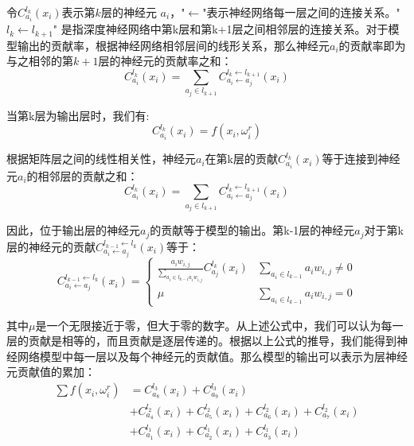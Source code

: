令$C_{a_{i}}^{l_{k}}\left(x_{i}\right)$表示第$k$层的神经元 $a_{i}$，"$\leftarrow$"表示神经网络每一层之间的连接关系。"$l_{k} \leftarrow l_{k+1}$" 是指深度神经网络中第k层和第k+1层之间相邻层的连接关系。对于模型输出的贡献率，根据神经网络相邻层间的线形关系，那么神经元$a_{i}$的贡献率即为与之相邻的第$k+1$层的神经元的贡献率之和：
$$
C_{a_{i}}^{l_{k}}\left(x_{i}\right)=\sum_{a_{j} \in l_{k+1}} C_{a_{i} \leftarrow a_{j}}^{l_{k} \leftarrow l_{k+1}}\left(x_{i}\right)
$$

当第k层为输出层时，我们有:
\begin{equation}
C_{a_{i}}^{l_{k}}\left(x_{i}\right)=f\left(x_{i}, \omega_{i}^{r}\right)
\end{equation}

根据矩阵层之间的线性相关性，神经元$a_{i}$在第k层的贡献$C_{a_{i}}^{l_{k}}\left(x_{i}\right)$等于连接到神经元$a_{i}$的相邻层的贡献之和：
\begin{equation}\label{eq:层间传播1}
C_{a_{i}}^{l_{k}}\left(x_{i}\right)=\sum_{a_{j} \in l_{k+1}} C_{a_{i} \leftarrow a_{j}}^{l_{k} \leftarrow l_{k+1}}\left(x_{i}\right)
\end{equation}

因此，位于输出层的神经元$a_{j}$的贡献等于模型的输出。第k-1层的神经元$a_{j}$对于第k层的神经元的贡献$C_{a_{i} \leftarrow a_{j}}^{l_{k-1} \leftarrow l_{k}}\left(x_{i}\right)$等于：
\begin{equation}
C_{a_{i} \leftarrow a_{j}}^{l_{k-1} \leftarrow l_{k}}\left(x_{i}\right)=\left\{\begin{array}{cc}\frac{a_{i} w_{i, j}}{\sum_{a_{i} \in l_{k-1} a_{i} w_{i, j}}} C_{a_{j}}^{l_{k}}\left(x_{i}\right) & \sum_{a_{i} \in l_{k-1}} a_{i} w_{i, j} \neq 0 \\ \mu & \sum_{a_{i} \in l_{k-1}} a_{i} w_{i, j}=0\end{array}\right.
\end{equation}

其中$\mu$是一个无限接近于零，但大于零的数字。从上述公式中，我们可以认为每一层的贡献是相等的，而且贡献是逐层传递的。根据以上公式的推导，我们能得到神经网络模型中每一层以及每个神经元的贡献值。那么模型的输出可以表示为层神经元贡献值的累加：
$$
\begin{aligned}
\sum f\left(x_{i}, \omega_{i}^{r}\right) &=C_{a_{8}}^{l_{3}}\left(x_{i}\right)+C_{a_{9}}^{l_{3}}\left(x_{i}\right)\\
&+C_{a_{4}}^{l_{2}}\left(x_{i}\right)+C_{a_{5}}^{l_{2}}\left(x_{i}\right)+C_{a_{6}}^{l_{2}}\left(x_{i}\right)+C_{a_{7}}^{l_{2}}\left(x_{i}\right)\\
&+C_{a_{1}}^{l_{1}}\left(x_{i}\right)+C_{a_{2}}^{l_{1}}\left(x_{i}\right)+C_{a_{3}}^{l_{1}}\left(x_{i}\right)
\end{aligned}
$$

